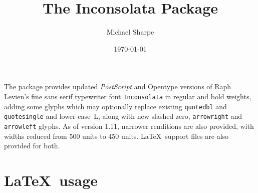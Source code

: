 \documentclass[11pt]{article}
\title{The Inconsolata  Package}
\author{Michael Sharpe}
\date{\today}  %
\begin{document}
\maketitle
The package provides updated \emph{PostScript} and Opentype versions of Raph Levien's fine sans serif typewriter font
\texttt{Inconsolata} in regular and bold weights, adding some glyphs which may optionally replace existing \texttt{quotedbl} and \texttt{quotesingle} and lower-case~L, along with new slashed zero, \texttt{arrowright} and \texttt{arrowleft} glyphs. As of version 1.11,  narrower renditions are also provided, with widths reduced from 500 units to 450 units. \LaTeX\ support files are also provided for both. 

\section*{\LaTeX\ usage}
\end{document}
